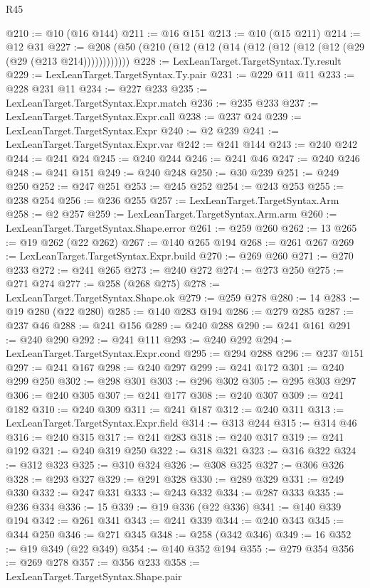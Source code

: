 \begin{lexlean}{R45}
\begin{coremodule}
@210 := @10 (@16 @144)
@211 := @16 @151
@213 := @10 (@15 @211)
@214 := @12 @31
@227 := @208 (@50 (@210 (@12 (@12 (@14 (@12 (@12 (@12 (@12 (@29 (@29 (@213 @214))))))))))))
@228 := LexLeanTarget.TargetSyntax.Ty.result
@229 := LexLeanTarget.TargetSyntax.Ty.pair
@231 := @229 @11 @11
@233 := @228 @231 @11
@234 := @227 @233
@235 := LexLeanTarget.TargetSyntax.Expr.match
@236 := @235 @233
@237 := LexLeanTarget.TargetSyntax.Expr.call
@238 := @237 @24
@239 := LexLeanTarget.TargetSyntax.Expr
@240 := @2 @239
@241 := LexLeanTarget.TargetSyntax.Expr.var
@242 := @241 @144
@243 := @240 @242
@244 := @241 @24
@245 := @240 @244
@246 := @241 @46
@247 := @240 @246
@248 := @241 @151
@249 := @240 @248
@250 := @30 @239
@251 := @249 @250
@252 := @247 @251
@253 := @245 @252
@254 := @243 @253
@255 := @238 @254
@256 := @236 @255
@257 := LexLeanTarget.TargetSyntax.Arm
@258 := @2 @257
@259 := LexLeanTarget.TargetSyntax.Arm.arm
@260 := LexLeanTarget.TargetSyntax.Shape.error
@261 := @259 @260
@262 := 13
@265 := @19 @262 (@22 @262)
@267 := @140 @265 @194
@268 := @261 @267
@269 := LexLeanTarget.TargetSyntax.Expr.build
@270 := @269 @260
@271 := @270 @233
@272 := @241 @265
@273 := @240 @272
@274 := @273 @250
@275 := @271 @274
@277 := @258 (@268 @275)
@278 := LexLeanTarget.TargetSyntax.Shape.ok
@279 := @259 @278
@280 := 14
@283 := @19 @280 (@22 @280)
@285 := @140 @283 @194
@286 := @279 @285
@287 := @237 @46
@288 := @241 @156
@289 := @240 @288
@290 := @241 @161
@291 := @240 @290
@292 := @241 @111
@293 := @240 @292
@294 := LexLeanTarget.TargetSyntax.Expr.cond
@295 := @294 @288
@296 := @237 @151
@297 := @241 @167
@298 := @240 @297
@299 := @241 @172
@301 := @240 @299 @250
@302 := @298 @301
@303 := @296 @302
@305 := @295 @303 @297
@306 := @240 @305
@307 := @241 @177
@308 := @240 @307
@309 := @241 @182
@310 := @240 @309
@311 := @241 @187
@312 := @240 @311
@313 := LexLeanTarget.TargetSyntax.Expr.field
@314 := @313 @244
@315 := @314 @46
@316 := @240 @315
@317 := @241 @283
@318 := @240 @317
@319 := @241 @192
@321 := @240 @319 @250
@322 := @318 @321
@323 := @316 @322
@324 := @312 @323
@325 := @310 @324
@326 := @308 @325
@327 := @306 @326
@328 := @293 @327
@329 := @291 @328
@330 := @289 @329
@331 := @249 @330
@332 := @247 @331
@333 := @243 @332
@334 := @287 @333
@335 := @236 @334
@336 := 15
@339 := @19 @336 (@22 @336)
@341 := @140 @339 @194
@342 := @261 @341
@343 := @241 @339
@344 := @240 @343
@345 := @344 @250
@346 := @271 @345
@348 := @258 (@342 @346)
@349 := 16
@352 := @19 @349 (@22 @349)
@354 := @140 @352 @194
@355 := @279 @354
@356 := @269 @278
@357 := @356 @233
@358 := LexLeanTarget.TargetSyntax.Shape.pair

\end{coremodule}
\end{lexlean}
